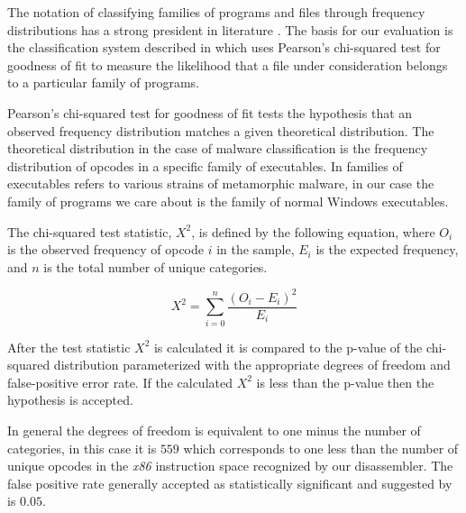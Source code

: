     The notation of classifying families of programs and files through
    frequency distributions has a strong president in literature
    \cite{chisquared,hmm_evade,stat_model,fileprints}. The basis for our
    evaluation is the classification system described in \cite{chisquared}
    which uses Pearson's chi-squared test for goodness of fit to measure the
    likelihood that a file under consideration belongs to a particular
    family of programs.

    Pearson's chi-squared test for goodness of fit tests the hypothesis that
    an observed frequency distribution matches a given theoretical
    distribution. The theoretical distribution in the case of malware
    classification is the frequency distribution of opcodes in a specific
    family of executables. In \cite{chisquared} families of executables
    refers to various strains of metamorphic malware, in our case the family
    of programs we care about is the family of normal Windows executables.
    

    The chi-squared test statistic, $X^2$, is defined by the following
    equation, where $O_i$ is the observed frequency of opcode $i$ in the
    sample, $E_i$ is the expected frequency, and $n$ is the total number of
    unique categories.

    $$X^2 = \sum_{i=0}^{n} \frac{(O_i - E_i)^2}{E_i}$$

    After the test statistic $X^2$ is calculated it is compared to the
    p-value of the chi-squared distribution parameterized with the
    appropriate degrees of freedom and false-positive error rate. If the
    calculated $X^2$ is less than the p-value then the hypothesis is
    accepted.

    In general the degrees of freedom is equivalent to one minus the number
    of categories, in this case it is $559$ which corresponds to one less
    than the number of unique opcodes in the \emph{x86} instruction space
    recognized by our disassembler. The false positive rate generally
    accepted as statistically significant and suggested by \cite{chisquared}
    is $0.05$.


